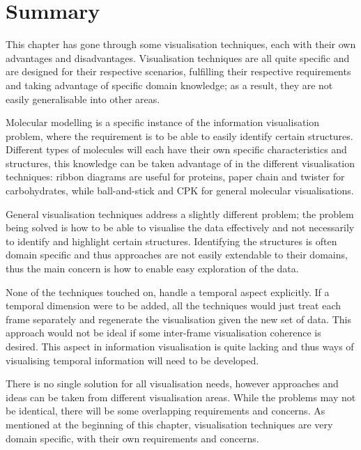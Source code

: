

\section{Summary}
\label{sec:background_end}

This chapter has gone through some visualisation techniques, each with their own
advantages and disadvantages. Visualisation techniques are all quite specific
and are designed for their respective scenarios, fulfilling their respective
requirements and taking advantage of specific domain knowledge; as a result,
they are not easily generalisable into other areas.

Molecular modelling is a specific instance of the information visualisation
problem, where the requirement is to be able to easily identify certain
structures. Different types of molecules will each have their own specific
characteristics and structures, this knowledge can be taken advantage of in the
different visualisation techniques: ribbon diagrams are useful for proteins,
paper chain and twister for carbohydrates, while ball-and-stick and CPK for
general molecular visualisations.

General visualisation techniques address a slightly different problem; the
problem being solved is how to be able to visualise the data effectively and
not necessarily to identify and highlight certain structures. Identifying the
structures is often domain specific and thus approaches are not easily
extendable to their domains, thus the main concern is how to enable easy
exploration of the data.

None of the techniques touched on, handle a temporal aspect explicitly. If a
temporal dimension were to be added, all the techniques would just treat each
frame separately and regenerate the visualisation given the new set of data.
This approach would not be ideal if some inter-frame visualisation coherence is
desired. This aspect in information visualisation is quite lacking and thus ways
of visualising temporal information will need to be developed.

There is no single solution for all visualisation needs, however approaches and
ideas can be taken from different visualisation areas. While the problems may
not be identical, there will be some overlapping requirements and concerns. As
mentioned at the beginning of this chapter, visualisation techniques are very
domain specific, with their own requirements and concerns.

